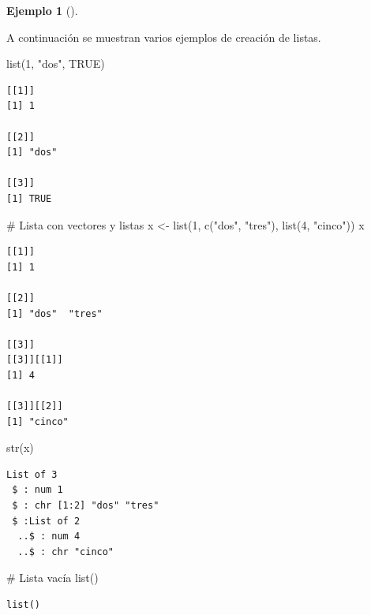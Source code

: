 \documentclass[
  a4paper,
]{scrreport}
\newenvironment{Shaded}{\begin{snugshade}}{\end{snugshade}}
\newcommand{\CommentTok}[1]{\textcolor[rgb]{0.37,0.37,0.37}{#1}}
\newcommand{\ConstantTok}[1]{\textcolor[rgb]{0.56,0.35,0.01}{#1}}
\newcommand{\DecValTok}[1]{\textcolor[rgb]{0.68,0.00,0.00}{#1}}
\newcommand{\FunctionTok}[1]{\textcolor[rgb]{0.28,0.35,0.67}{#1}}
\newcommand{\NormalTok}[1]{\textcolor[rgb]{0.00,0.23,0.31}{#1}}
\newcommand{\OtherTok}[1]{\textcolor[rgb]{0.00,0.23,0.31}{#1}}
\newcommand{\StringTok}[1]{\textcolor[rgb]{0.13,0.47,0.30}{#1}}
\theoremstyle{definition}
\newtheorem{example}{Ejemplo}[chapter]
\theoremstyle{definition}
\theoremstyle{remark}
\begin{document}
\leavevmode{}%
\begin{example}[]\label{exm-creacion-listas}

A continuación se muestran varios ejemplos de creación de listas.

\begin{Shaded}
\begin{Highlighting}[]
\FunctionTok{list}\NormalTok{(}\DecValTok{1}\NormalTok{, }\StringTok{"dos"}\NormalTok{, }\ConstantTok{TRUE}\NormalTok{)}
\end{Highlighting}
\end{Shaded}

\begin{verbatim}
[[1]]
[1] 1

[[2]]
[1] "dos"

[[3]]
[1] TRUE
\end{verbatim}

\begin{Shaded}
\begin{Highlighting}[]
\CommentTok{\# Lista con vectores y listas}
\NormalTok{x }\OtherTok{\textless{}{-}} \FunctionTok{list}\NormalTok{(}\DecValTok{1}\NormalTok{, }\FunctionTok{c}\NormalTok{(}\StringTok{"dos"}\NormalTok{, }\StringTok{"tres"}\NormalTok{), }\FunctionTok{list}\NormalTok{(}\DecValTok{4}\NormalTok{, }\StringTok{"cinco"}\NormalTok{))}
\NormalTok{x}
\end{Highlighting}
\end{Shaded}

\begin{verbatim}
[[1]]
[1] 1

[[2]]
[1] "dos"  "tres"

[[3]]
[[3]][[1]]
[1] 4

[[3]][[2]]
[1] "cinco"
\end{verbatim}

\begin{Shaded}
\begin{Highlighting}[]
\FunctionTok{str}\NormalTok{(x)}
\end{Highlighting}
\end{Shaded}

\begin{verbatim}
List of 3
 $ : num 1
 $ : chr [1:2] "dos" "tres"
 $ :List of 2
  ..$ : num 4
  ..$ : chr "cinco"
\end{verbatim}

\begin{Shaded}
\begin{Highlighting}[]
\CommentTok{\# Lista vacía}
\FunctionTok{list}\NormalTok{()}
\end{Highlighting}
\end{Shaded}

\begin{verbatim}
list()
\end{verbatim}

\end{example}
\end{document}
